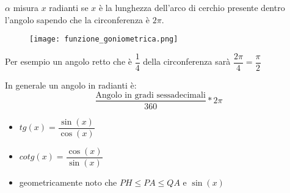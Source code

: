 \documentclass[../main.tex, class=article, 12pt]{subfiles}
\begin{document}
$ \alpha $ misura $ x $ radianti se  $ x $ è la lunghezza dell'arco di cerchio presente dentro l'angolo sapendo che la circonferenza è $ \boxed{2\pi}$.
\begin{figure}[H]
  	\texttt{[image: funzione\_goniometrica.png]}
  	\caption{}
        \label{fig:funzione_trigonometrica}
\end{figure}



\begin{exmp}
        Per esempio un angolo retto che è $ \dfrac{1}{4} $ della circonferenza sarà $\dfrac{2\pi}{4} = \dfrac{\pi}{2}$ 
\end{exmp}

In generale un angolo in radianti è:
\begin{equation*}
       \frac{\mbox{Angolo in gradi sessadecimali}}{360} * 2\pi 
\end{equation*}

\begin{itemize}
        \item $ tg(x) = \dfrac{\sin(x)}{\cos(x)} $
        \item $ cotg(x) = \dfrac{\cos(x)}{\sin(x)} $
        \item geometricamente noto che $PH \le PA \le QA $ e $ \sin(x) $
\end{itemize}
\end{document}
